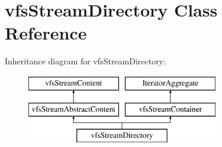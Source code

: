 \hypertarget{classorg_1_1bovigo_1_1vfs_1_1vfs_stream_directory}{}\section{vfs\+Stream\+Directory Class Reference}
\label{classorg_1_1bovigo_1_1vfs_1_1vfs_stream_directory}
Inheritance diagram for vfs\+Stream\+Directory\+:\begin{figure}[H]
\begin{center}
\leavevmode
\includegraphics[height=3.000000cm]{classorg_1_1bovigo_1_1vfs_1_1vfs_stream_directory}
\end{center}
\end{figure}
